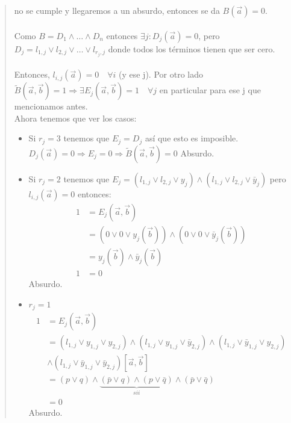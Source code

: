 \documentclass[11pt, a4paper]{article}
\theoremstyle{definition}
\begin{document}
\begin{quote}
    no se cumple y llegaremos a un absurdo, entonces se da $B(\vec{a}) = 0$.\\ \\
    Como $B = D_1 \wedge \ldots \wedge D_n$ entonces $\exists j : D_j(\vec{a}) = 0$, pero $D_j = l_{1,j} \vee l_{2,j} \vee \ldots \vee l_{r_j,j}$
    donde todos los términos tienen que ser cero.\\ \\
    Entonces, $l_{i,j}(\vec{a}) = 0 \quad \forall i$ (y ese j). Por otro lado $\tilde{B}(\vec{a}, \vec{b}) = 1 \Rightarrow \exists E_j(\vec{a}, \vec{b}) = 1 \quad \forall j$
    en particular para ese j que mencionamos antes.\\
    Ahora tenemos que ver los casos:

    \begin{itemize}
        \item Si $r_j = 3$ tenemos que $E_j = D_j$ así que esto es imposible. $D_j(\vec{a}) = 0 \Rightarrow E_j = 0 \Rightarrow
        \tilde{B}(\vec{a}, \vec{b}) = 0$ Absurdo.
        
        \item Si $r_j = 2$ tenemos que $E_j = (l_{1,j} \vee l_{2,j} \vee y_j) \wedge (l_{1,j} \vee l_{2,j} \vee \bar{y}_j)$ pero $l_{i,j}(\vec{a}) = 0$ entonces:
        \begin{align*}
        1 &= E_j(\vec{a}, \vec{b}) \\
        &= (0 \vee 0 \vee y_j(\vec{b})) \wedge (0 \vee 0 \vee \bar{y}_j(\vec{b})) \\
        &= y_j(\vec{b}) \wedge \bar{y}_j(\vec{b}) \\
        1 &= 0
        \end{align*}
        Absurdo.
        
        \item $r_j = 1$
        \begin{align*}
        1 &= E_j(\vec{a}, \vec{b}) \\
        &= (l_{1,j} \vee y_{1,j} \vee y_{2,j}) \wedge (l_{1,j} \vee y_{1,j} \vee \bar{y}_{2,j}) \wedge (l_{1,j} \vee \bar{y}_{1,j} \vee y_{2,j}) \\
        &\wedge (l_{1,j} \vee \bar{y}_{1,j} \vee \bar{y}_{2,j})[\vec{a}, \vec{b}] \\
        &= (p \vee q) \wedge \underbrace {(\bar{p} \vee q) \wedge (p \vee \bar{q})}_{sii} \wedge(\bar{p} \vee \bar{q}) \\
        &= 0
        \end{align*}
        Absurdo.
        

\end{itemize}
\end{quote}
\end{document}
